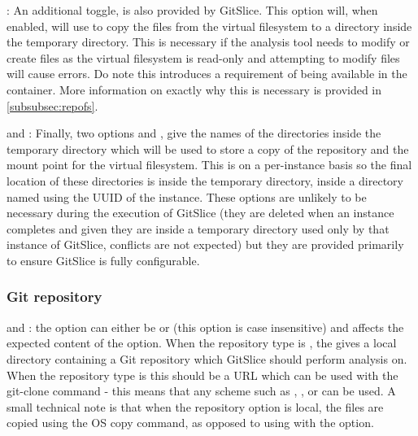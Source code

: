 \documentclass[11pt]{article}
\begin{document}
    : An additional toggle,  is also provided by GitSlice.
    This option will, when enabled, will use  to copy the files from the virtual filesystem to a directory inside the temporary directory.
    This is necessary if the analysis tool needs to modify or create files as the virtual filesystem is read-only and attempting to modify files will cause errors.
    Do note this introduces a requirement of  being available in the container.
    More information on exactly why this is necessary is provided in \autoref{subsubsec:repofs}.

     and : Finally, two options  and , give the names of the directories inside the temporary directory which will be used to store a copy of the repository and the mount point for the virtual filesystem.
    This is on a per-instance basis so the final location of these directories is inside the temporary directory, inside a directory named using the UUID of the instance.
    These options are unlikely to be necessary during the execution of GitSlice (they are deleted when an instance completes and given they are inside a temporary directory used only by that instance of GitSlice, conflicts are not expected) but they are provided primarily to ensure GitSlice is fully configurable.

    \subsubsection{Git repository}

     and : the  option can either be  or  (this option is case insensitive) and affects the expected content of the  option.
    When the repository type is , the  gives a local directory containing a Git repository which GitSlice should perform analysis on.
    When the repository type is  this should be a URL which can be used with the git-clone command - this means that any scheme such as , ,  or  can be used.
    A small technical note is that when the repository option is local, the files are copied using the OS copy command, as opposed to using  with the  option.
\end{document}
